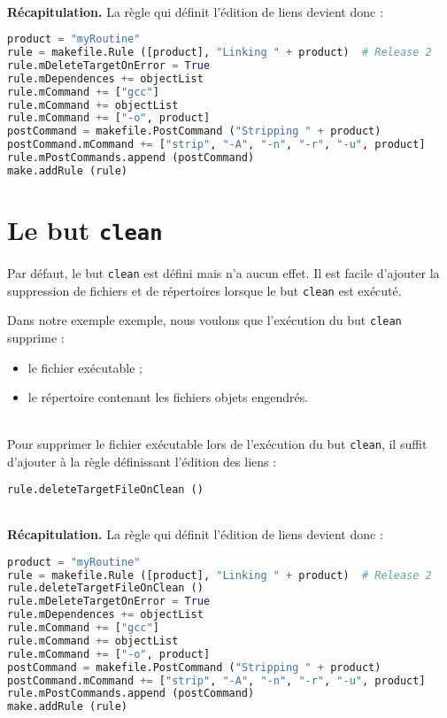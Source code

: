 \documentclass[a4paper,11pt]{extarticle}
\begin{document}
~\\{\bf Récapitulation.} La règle qui définit l'édition de liens devient donc :
\begin{lstlisting}[language=py]
product = "myRoutine"
rule = makefile.Rule ([product], "Linking " + product)  # Release 2
rule.mDeleteTargetOnError = True
rule.mDependences += objectList
rule.mCommand += ["gcc"]
rule.mCommand += objectList
rule.mCommand += ["-o", product]
postCommand = makefile.PostCommand ("Stripping " + product)
postCommand.mCommand += ["strip", "-A", "-n", "-r", "-u", product]
rule.mPostCommands.append (postCommand)
make.addRule (rule)
\end{lstlisting}







\section{Le but \texttt{clean}}

Par défaut, le but \texttt{clean} est défini mais n'a aucun effet. Il est facile d'ajouter la suppression de fichiers et de répertoires lorsque le but \texttt{clean} est exécuté.

Dans notre exemple exemple, nous voulons que l'exécution du but \texttt{clean} supprime :
\begin{itemize}
  \item le fichier exécutable ;
  \item le répertoire contenant les fichiers objets engendrés.
\end{itemize}

~\\Pour supprimer le fichier exécutable lors de l'exécution du but \texttt{clean}, il suffit d'ajouter à la règle définissant l'édition des liens :

\begin{lstlisting}[language=py]
rule.deleteTargetFileOnClean ()
\end{lstlisting}


~\\{\bf Récapitulation.} La règle qui définit l'édition de liens devient donc :
\begin{lstlisting}[language=py]
product = "myRoutine"
rule = makefile.Rule ([product], "Linking " + product)  # Release 2
rule.deleteTargetFileOnClean ()
rule.mDeleteTargetOnError = True
rule.mDependences += objectList
rule.mCommand += ["gcc"]
rule.mCommand += objectList
rule.mCommand += ["-o", product]
postCommand = makefile.PostCommand ("Stripping " + product)
postCommand.mCommand += ["strip", "-A", "-n", "-r", "-u", product]
rule.mPostCommands.append (postCommand)
make.addRule (rule)
\end{lstlisting}
\end{document}
